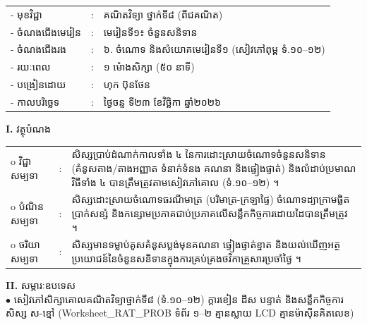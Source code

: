 \documentclass[a4paper,10pt]{article}
\newcommand{\wcirc}{{\CourierBullet\fontsize{9.5pt}{11pt}\selectfont o}}
\newcommand{\en}[1]{{\TimesEn #1}}
\begin{document}
{\renewcommand{\arraystretch}{0.98}
\hspace*{3.1cm}%
\begin{tabular}{@{}l l L{11.0cm}@{}}
  - \hspace{0.35cm} មុខវិជ្ជា & : & គណិតវិទ្យា ថ្នាក់ទី៨ (ពីជគណិត) \\
  - \hspace{0.35cm} ចំណងជើងមេរៀន & : & មេរៀនទី១៖ ចំនួនសនិទាន \\
  - \hspace{0.35cm} ចំណងជើងរង & : & ៦. ចំណោទ និងសំយោគមេរៀនទី១ (សៀវភៅពុម្ព ទំ.១០–១២) \\
  - \hspace{0.35cm} រយៈពេល & : & ១ ម៉ោងសិក្សា (៥០ នាទី) \\
  - \hspace{0.35cm} បង្រៀនដោយ & : & ហុក ប៊ុនថែន \\
  - \hspace{0.35cm} កាលបរិច្ឆេទ & : & ថ្ងៃចន្ទ ទី២៣ ខែវិច្ឆិកា ឆ្នាំ២០២៦ \\
\end{tabular}

\vspace{2pt}

\textbf{I.} {\muol វត្ថុបំណង}\\[1pt]
\hspace*{0.55cm}%
\begin{tabular}{@{}l l L{14.2cm}@{}}
  \wcirc \hspace{0.25cm} វិជ្ជាសម្បទា & : & សិស្សប្រាប់ដំណាក់កាលទាំង ៤ នៃការដោះស្រាយចំណោទចំនួនសនិទាន (គំនូសតាង/តាងអញ្ញាត ទំនាក់ទំនង គណនា និងផ្ទៀងផ្ទាត់) និងលំដាប់ប្រមាណវិធីទាំង ៤ បានត្រឹមត្រូវតាមសៀវភៅគោល (ទំ.១០–១២) ។ \\
  \wcirc \hspace{0.25cm} បំណិនសម្បទា & : & សិស្សដោះស្រាយចំណោទធរណីមាត្រ (បរិមាត្រ-ក្រឡាផ្ទៃ) ចំណោទដ្យាក្រាមផ្លិតប្រាក់សន្សំ និងកន្សោមប្រភាគជាប់ប្រភាគលើសន្លឹកកិច្ចការដោយដៃបានត្រឹមត្រូវ ។ \\
  \wcirc \hspace{0.25cm} ចរិយាសម្បទា & : & សិស្សមានទម្លាប់គូសគំនូសប្លង់មុនគណនា ផ្ទៀងផ្ទាត់ខ្នាត និងយល់ឃើញអត្ថប្រយោជន៍នៃចំនួនសនិទានក្នុងការគ្រប់គ្រងថវិកាគ្រួសារប្រចាំថ្ងៃ ។ \\
\end{tabular}

\vspace{2pt}

\textbf{II.} {\muol សម្ភារៈឧបទេស}\\[1pt]
\hspace*{0.55cm}$\bullet$ \hspace{0.35cm} សៀវភៅសិក្សាគោលគណិតវិទ្យាថ្នាក់ទី៨ (ទំ.១០–១២) ក្ដារខៀន ដីស បន្ទាត់ និងសន្លឹកកិច្ចការសិស្ស ស-ខ្មៅ (\en{Worksheet\_RAT\_PROB} ទំព័រ ១–២ គ្មានស្លាយ \en{LCD} គ្មានម៉ាស៊ីនគិតលេខ)

}
\end{document}

